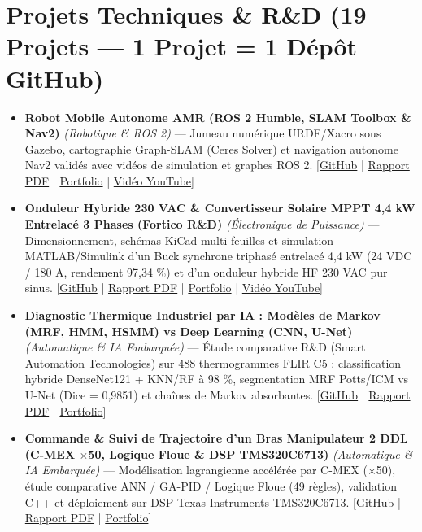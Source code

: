 \documentclass[10pt,a4paper]{article}
\begin{document}
\section*{Projets Techniques \& R\&D (19 Projets — 1 Projet = 1 D\'ep\^ot GitHub)}
\begin{itemize}
\item \textbf{Robot Mobile Autonome AMR (ROS 2 Humble, SLAM Toolbox \& Nav2)} \textit{(Robotique \& ROS 2)} --- Jumeau numérique URDF/Xacro sous Gazebo, cartographie Graph-SLAM (Ceres Solver) et navigation autonome Nav2 validés avec vidéos de simulation et graphes ROS 2. [\href{https://github.com/scidelo-andriasahy/ros2-amr-slam-nav2}{GitHub} | \href{https://scidelo-andriasahy.github.io/assets/pdfs/Rapport_Projet_AMR_ROS2.pdf}{Rapport PDF} | \href{https://scidelo-andriasahy.github.io/?project=1}{Portfolio} | \href{https://youtu.be/BdZKrr3qsLc}{Vid\'eo YouTube}]
\item \textbf{Onduleur Hybride 230 VAC \& Convertisseur Solaire MPPT 4,4 kW Entrelacé 3 Phases (Fortico R\&D)} \textit{(Électronique de Puissance)} --- Dimensionnement, schémas KiCad multi-feuilles et simulation MATLAB/Simulink d'un Buck synchrone triphasé entrelacé 4,4 kW (24 VDC / 180 A, rendement 97,34 \%) et d'un onduleur hybride HF 230 VAC pur sinus. [\href{https://github.com/scidelo-andriasahy/mppt-4kw-hybrid-inverter-fortico}{GitHub} | \href{https://scidelo-andriasahy.github.io/assets/pdfs/Rapport_Simulation_MPPT_4kW_Fortico.pdf}{Rapport PDF} | \href{https://scidelo-andriasahy.github.io/?project=2}{Portfolio} | \href{https://youtu.be/MCnFn3AhC5s}{Vid\'eo YouTube}]
\item \textbf{Diagnostic Thermique Industriel par IA : Modèles de Markov (MRF, HMM, HSMM) vs Deep Learning (CNN, U-Net)} \textit{(Automatique \& IA Embarquée)} --- Étude comparative R\&D (Smart Automation Technologies) sur 488 thermogrammes FLIR C5 : classification hybride DenseNet121 + KNN/RF à 98 \%, segmentation MRF Potts/ICM vs U-Net (Dice = 0,9851) et chaînes de Markov absorbantes. [\href{https://github.com/scidelo-andriasahy/PROJET_THERMIQUE_2}{GitHub} | \href{https://scidelo-andriasahy.github.io/assets/pdfs/Rapport_PFA_Diagnostic_Thermique_IA_SAT.pdf}{Rapport PDF} | \href{https://scidelo-andriasahy.github.io/?project=3}{Portfolio}]
\item \textbf{Commande \& Suivi de Trajectoire d'un Bras Manipulateur 2 DDL (C-MEX $\times$50, Logique Floue \& DSP TMS320C6713)} \textit{(Automatique \& IA Embarquée)} --- Modélisation lagrangienne accélérée par C-MEX ($\times$50), étude comparative ANN / GA-PID / Logique Floue (49 règles), validation C++ et déploiement sur DSP Texas Instruments TMS320C6713. [\href{https://github.com/scidelo-andriasahy/robot-2dof-fuzzy-gapid-dsp-tms320c6713}{GitHub} | \href{https://scidelo-andriasahy.github.io/assets/pdfs/ROBOT2DOF_Scidelo_FR.pdf}{Rapport PDF} | \href{https://scidelo-andriasahy.github.io/?project=4}{Portfolio}]

\end{itemize}
\end{document}
